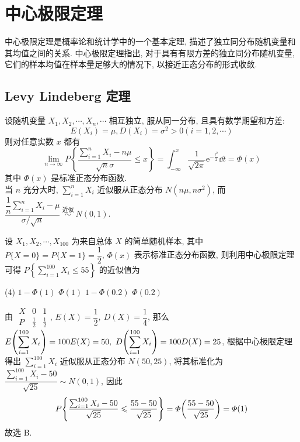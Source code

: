 \section{中心极限定理}

中心极限定理是概率论和统计学中的一个基本定理, 描述了独立同分布随机变量和其均值之间的关系. 中心极限定理指出, 对于具有有限方差的独立同分布随机变量, 它们的样本均值在样本量足够大的情况下, 以接近正态分布的形式收敛. 

\subsection{Levy Lindeberg 定理}

\begin{theorem}
    设随机变量 $ X_{1}, X_{2}, \cdots, X_{n}, \cdots $ 相互独立, 服从同一分布, 且具有数学期望和方差:
    $$E\left(X_{i}\right)=\mu, D\left(X_{i}\right)=\sigma^{2}>0(i=1,2, \cdots)$$
    则对任意实数 $ x $ 都有
    $$\lim _{n \rightarrow \infty} P\left\{\frac{\sum_{i=1}^{n} X_{i}-n \mu}{\sqrt{n} \sigma} \leqslant x\right\}=\int_{-\infty}^{x} \frac{1}{\sqrt{2 \pi}} \mathrm{e}^{-\frac{t^{2}}{2}}\dd t=\varPhi(x)$$
    其中 $ \varPhi(x) $ 是标准正态分布函数.\\
    当 $ n $ 充分大时, 
    $\displaystyle \sum_{i=1}^{n} X_{i} \text { 近似服从正态分布 } N\left(n \mu, n \sigma^{2}\right) $, 
    而 $\dfrac{\displaystyle \dfrac{1}{n}\sum_{i=1}^{n} X_{i}-\mu}{\sigma / \sqrt{n}} \stackrel{\text { 近似 }}{\sim} N(0,1) .$
\end{theorem}

\begin{example}[2022 数一]
    设 $ X_{1}, X_{2}, \cdots, X_{100} $ 为来自总体 $ X $ 的简单随机样本, 
    其中 $ P\{X=0\}=P\{X=1\}=\dfrac{1}{2}$, $\varPhi(x) $ 表示标准正态分布函数, 则利用中心极限定理可得 $ \displaystyle P\left\{\sum_{i=1}^{100} X_{i} \leqslant 55\right\} $ 的近似值为 
    \begin{tasks}(4)
        \task $1-\varPhi(1)$
        \task $\varPhi(1)$
        \task $1-\varPhi(0.2)$
        \task $\varPhi(0.2)$
    \end{tasks}
\end{example}
\begin{solution}
    由 $\begin{array}{c|cc}
        X & 0           & 1           \\\hline
        P & \frac{1}{2} & \frac{1}{2}
    \end{array}$, $E(X)=\dfrac{1}{2},~D(X)=\dfrac{1}{4}$, 那么 $\displaystyle E\qty(\sum_{i=1}^{100}X_i)=100E(X)=50,~D\qty(\sum_{i=1}^{100}X_i)=100 D(X)=25$, 根据中心极限定理得出
    $\displaystyle\sum_{i=1}^{100}X_i$ 近似服从正态分布 $N(50,25)$, 将其标准化为 $\dfrac{\displaystyle\sum_{i=1}^{100}X_i-50}{\sqrt{25}}\sim N(0,1)$, 因此 
    $$P\qty{\dfrac{\sum_{i=1}^{100}X_i-50}{\sqrt{25}}\leqslant \dfrac{55-50}{\sqrt{25}}}=\varPhi\qty(\dfrac{55-50}{\sqrt{25}})=\varPhi(1)$$
    故选 B.
\end{solution}

